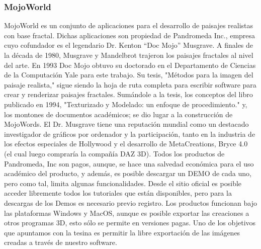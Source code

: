 \documentclass[12pt]{article} %
\begin{document}
\subsubsection{MojoWorld}
MojoWorld es un conjunto de aplicaciones para el desarrollo de paisajes realistas con base fractal. Dichas aplicaciones son propiedad de Pandromeda Inc., empresa cuyo cofundador es el legendario Dr. Kenton “Doc Mojo” Musgrave.
A finales de la década de 1980, Musgrave y Mandelbrot trajeron los paisajes fractales al nivel del arte. En 1993 Doc Mojo obtuvo su doctorado en el Departamento de Ciencias de la Computación Yale para este trabajo. Su tesis, "Métodos para la imagen del paisaje realista," sigue siendo la hoja de ruta completa para escribir software para crear y renderizar paisajes fractales. Sumándole a la tesis, los conceptos del libro publicado en 1994, "Texturizado y Modelado: un enfoque de procedimiento." y, los montones de documentos académicos; se dio lugar a la construcción de MojoWords.
El Dr. Musgrave tiene una reputación mundial como un destacado investigador de gráficos por ordenador y la participación, tanto en la industria de los efectos especiales de Hollywood y el desarrollo de MetaCreations, Bryce 4.0 (el cual luego compraría la compañía DAZ 3D).
Todos los productos de Pandromeda, Inc son pagos, aunque, se hace una salvedad económica para el uso académico del producto, y además, es posible descargar un DEMO de cada uno, pero como tal, limita algunas funcionalidades. Desde el sitio oficial es posible acceder libremente todos los tutoriales que están disponibles, pero para la descargas de los Demos es necesario previo registro. Los productos funcionan bajo las plataformas Windows y MacOS, aunque es posible exportar  las creaciones a otros programas 3D, esto sólo se permite en versiones pagas.
Uno de los objetivos que apuntamos con la tesina es permitir la libre exportación de las imágenes creadas a través de nuestro software.
\end{document}
